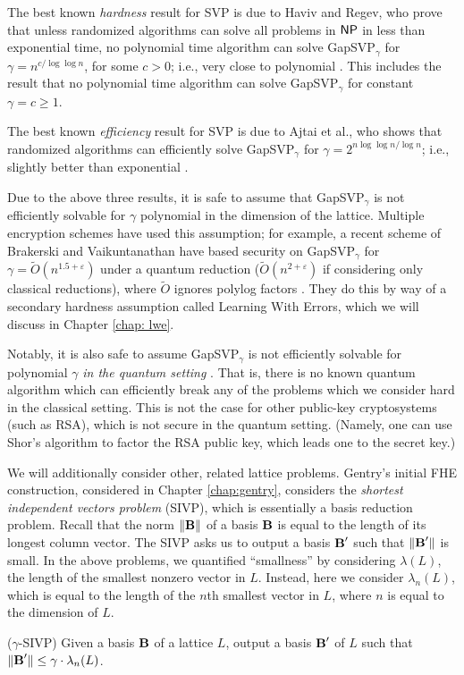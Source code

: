 The best known \emph{hardness} result for SVP is due to Haviv and Regev, who prove that unless randomized algorithms can solve all problems in ${\sf NP}$ in less than exponential time, no polynomial time algorithm can solve GapSVP$_\gamma$ for $\gamma = n^{c / \log \log n}$, for some $c > 0$; i.e., very close to polynomial \cite{haviv2007tensor}. This includes the result that no polynomial time algorithm can solve GapSVP$_\gamma$ for constant $\gamma = c \geq 1$.

The best known \emph{efficiency} result for SVP is due to Ajtai et al., who shows that randomized algorithms can efficiently solve GapSVP$_\gamma$ for $\gamma = 2^{n \log \log n / \log n}$; i.e., slightly better than exponential \cite{Ajtaisieve}.


Due to the above three results, it is safe to assume that GapSVP$_\gamma$ is not efficiently solvable for $\gamma$ polynomial in the dimension of the lattice. Multiple encryption schemes have used this assumption; for example, a recent scheme of Brakerski and Vaikuntanathan have based security on GapSVP$_\gamma$ for $\gamma = \widetilde{O}(n^{1.5 + \varepsilon})$ under a quantum reduction ($\widetilde{O}(n^{2 + \varepsilon})$ if considering only classical reductions), where $\widetilde{O}$ ignores polylog factors \cite{bv14}. They do this by way of a secondary hardness assumption called Learning With Errors, which we will discuss in Chapter \ref{chap: lwe}.

Notably, it is also safe to assume GapSVP$_\gamma$ is not efficiently solvable for polynomial $\gamma$ \emph{in the quantum setting} \cite{Peikertsurvey}. That is, there is no known quantum algorithm which can efficiently break any of the problems which we consider hard in the classical setting. This is not the case for other public-key cryptosystems (such as RSA), which is not secure in the quantum setting. (Namely, one can use Shor's algorithm to factor the RSA public key, which leads one to the secret key.)


We will additionally consider other, related lattice problems. Gentry's initial FHE construction, considered in Chapter \ref{chap:gentry}, considers the \emph{shortest independent vectors problem} (SIVP), which is essentially a basis reduction problem. Recall that the norm $\Vert \textbf{B} \Vert$ of a basis $\textbf{B}$ is equal to the length of its longest column vector. The SIVP asks us to output a basis $\textbf{B}'$ such that $\Vert \textbf{B}' \Vert$ is small. In the above problems, we quantified ``smallness'' by considering $\lambda(L)$, the length of the smallest nonzero vector in $L$. Instead, here we consider $\lambda_n(L)$, which is equal to the length of the $n$th smallest vector in $L$, where $n$ is equal to the dimension of $L$.
\begin{definition} ($\gamma$-SIVP)
    Given a basis $\textbf{B}$ of a lattice $L$, output a basis $\textbf{B}'$ of $L$ such that $\Vert \textbf{B}' \Vert \leq \gamma \cdot \lambda_n(L)$.
\end{definition}


